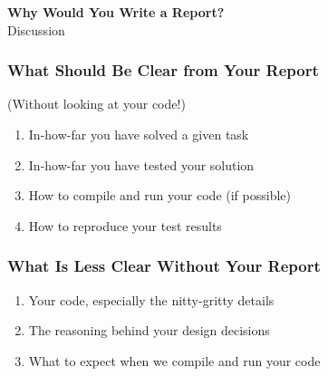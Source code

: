 \begin{frame}

\vspace{\fill}

\begin{center}

\Large


\textbf{Why Would You Write a Report?} \\[2em]

Discussion

\end{center}

\vspace{\fill}

\end{frame}

\begin{frame}

\frametitle{What Should Be Clear from Your Report}

(Without looking at your code!)

\vspace{\fill}

\begin{enumerate}

\item In-how-far you have solved a given task

\item In-how-far you have tested your solution

\item How to compile and run your code (if possible)

\item How to reproduce your test results

\end{enumerate}

\vspace{\fill}

\end{frame}


\begin{frame}

\frametitle{What Is Less Clear Without Your Report}

\vspace{\fill}

\begin{enumerate}

\item Your code, especially the nitty-gritty details

\item The reasoning behind your design decisions

\item What to expect when we compile and run your code

\end{enumerate}

\vspace{\fill}

\end{frame}


